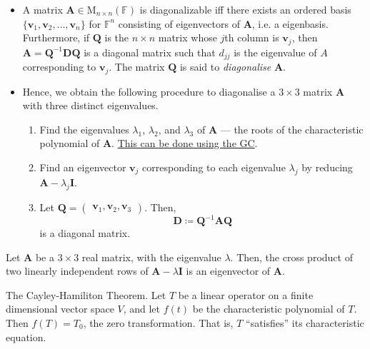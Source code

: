 \documentclass[../Notes.tex]{subfiles}
\begin{document}
\begin{stbox}{}
    \begin{itemize}
        \item A matrix \(\mathbf{A}\in\mathrm{M}_{n\times n}(\mathbb{F})\) is diagonalizable iff there exists an ordered basis \(\{\mathbf{v}_1,\mathbf{v}_2,\dots,\mathbf{v}_n\}\) for \(\mathbb{F}^n\) consisting of eigenvectors of \(\mathbf{A}\), i.e. a eigenbasis. Furthermore, if \(\mathbf{Q}\) is the \(n\times n\) matrix whose \(j\)th column is \(\mathbf{v}_j\), then \(\mathbf{A}=\mathbf{Q}^{-1}\mathbf{D}\mathbf{Q}\) is a diagonal matrix such that \(d_{jj}\) is the eigenvalue of \(A\) corresponding to \(\mathbf{v}_j\). The matrix \(\mathbf{Q}\) is said to \emph{diagonalise} \(\mathbf{A}\).
        \item Hence, we obtain the following procedure to diagonalise a \(3\times 3\) matrix \(\mathbf{A}\) with three distinct eigenvalues.
        \begin{enumerate}
            \item Find the eigenvalues \(\lambda_1\), \(\lambda_2\), and \(\lambda_3\) of \(\mathbf{A}\) --- the roots of the characteristic polynomial of \(\mathbf{A}\). \hyperlink{characteristic-polynomial-roots}{This can be done using the GC}.
            \item Find an eigenvector \(\mathbf{v}_j\) corresponding to each eigenvalue \(\lambda_j\) by reducing \(\mathbf{A}-\lambda_j\mathbf{I}
            \).
            \item Let \(\mathbf{Q}=
            \begin{pmatrix}
                \mathbf{v}_1,\mathbf{v}_2,\mathbf{v}_3
            \end{pmatrix}\). Then,
            \[\mathbf{D}\coloneq \mathbf{Q}^{-1}\mathbf{A}\mathbf{Q}\]
            is a diagonal matrix.
        \end{enumerate} 
    \end{itemize}    
\end{stbox}
\begin{note}
    Let \(\mathbf{A}\) be a \(3\times 3\) real matrix, with the eigenvalue \(\lambda\). Then, the cross product of two linearly independent rows of \(\mathbf{A}-\lambda \mathbf{I}\) is an eigenvector of \(\mathbf{A}\).
\end{note}
\begin{theorem}{The Cayley-Hamiliton Theorem.}{}
    Let \(T\) be a linear operator on a finite dimensional vector space \(V\), and let \(f(t)\) be the characteristic polynomial of \(T\). Then \(f(T)=T_0\), the zero transformation. That is, \(T\) ``satisfies'' its characteristic equation.
\end{theorem}
\end{document}
